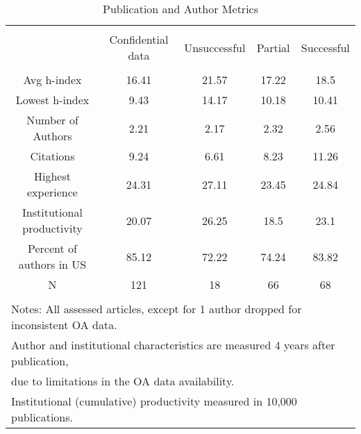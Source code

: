 
\begin{table}[!htbp] \centering 
  \caption{Publication and Author Metrics} 
  \label{tab:metrics:OA} 
\begin{tabular}{@{\extracolsep{0.4pt}} ccccc} 
\\[-1.8ex]\hline 
\hline \\[-1.8ex] 
  & Confidential data & Unsuccessful & Partial & Successful \\ 
\hline \\[-1.8ex] 
Avg h-index & 16.41 & 21.57 & 17.22 & 18.5 \\ 
Lowest h-index & 9.43 & 14.17 & 10.18 & 10.41 \\ 
Number of Authors & 2.21 & 2.17 & 2.32 & 2.56 \\ 
Citations & 9.24 & 6.61 & 8.23 & 11.26 \\ 
Highest experience & 24.31 & 27.11 & 23.45 & 24.84 \\ 
Institutional productivity & 20.07 & 26.25 & 18.5 & 23.1 \\ 
Percent of authors in US & 85.12 & 72.22 & 74.24 & 83.82 \\ 
N & 121 & 18 & 66 & 68 \\ 
\hline \\[-1.8ex] 
\multicolumn{5}{l}{Notes: All assessed articles, except for 1 author dropped for inconsistent OA data.} \\ 
\multicolumn{5}{l}{Author and institutional characteristics are measured 4 years after publication, } \\ 
\multicolumn{5}{l}{due to limitations in the OA data availability.} \\ 
\multicolumn{5}{l}{Institutional (cumulative) productivity measured in 10,000 publications.} \\ 
\end{tabular} 
\end{table} 
